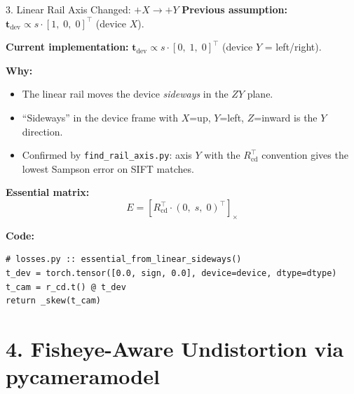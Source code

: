 \documentclass[aspectratio=169, 12pt]{beamer}
\newcommand{\Rcd}{R_{\mathrm{cd}}}
\newcommand{\skewmat}[1]{\left[#1\right]_{\times}}
\begin{document}
\begin{frame}{3. Linear Rail Axis Changed: $+X \to +Y$}
\small
\textbf{Previous assumption:}
$\mathbf{t}_{\mathrm{dev}} \propto s \cdot [1,\; 0,\; 0]^\top$ (device $X$).

\medskip
\textbf{Current implementation:}
$\mathbf{t}_{\mathrm{dev}} \propto s \cdot [0,\; 1,\; 0]^\top$ (device $Y$ = left/right).

\medskip
\textbf{Why:}
\begin{itemize}\setlength{\itemsep}{2pt}
    \item The linear rail moves the device \emph{sideways} in the $ZY$ plane.
    \item ``Sideways'' in the device frame with $X$=up, $Y$=left, $Z$=inward
          is the $Y$ direction.
    \item Confirmed by \texttt{find\_rail\_axis.py}: axis $Y$ with the $\Rcd^\top$
          convention gives the lowest Sampson error on SIFT matches.
\end{itemize}

\medskip
\textbf{Essential matrix:}
\[
    E = \skewmat{\Rcd^\top \cdot (0,\; s,\; 0)^\top}
\]

\textbf{Code:}
\begin{lstlisting}
# losses.py :: essential_from_linear_sideways()
t_dev = torch.tensor([0.0, sign, 0.0], device=device, dtype=dtype)
t_cam = r_cd.t() @ t_dev
return _skew(t_cam)
\end{lstlisting}
\end{frame}


\section{4. Fisheye-Aware Undistortion via pycameramodel}
\end{document}
